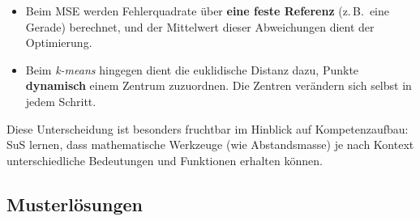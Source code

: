 \begin{itemize}
  \item Beim MSE werden Fehlerquadrate über \textbf{eine feste Referenz} (z.\,B.\ eine Gerade) berechnet, und der Mittelwert dieser Abweichungen dient der Optimierung.
  \item Beim \textit{k-means} hingegen dient die euklidische Distanz dazu, Punkte \textbf{dynamisch} einem Zentrum zuzuordnen. Die Zentren verändern sich selbst in jedem Schritt.
\end{itemize}

Diese Unterscheidung ist besonders fruchtbar im Hinblick auf Kompetenzaufbau: SuS lernen, dass mathematische Werkzeuge (wie Abstandsmasse) je nach Kontext unterschiedliche Bedeutungen und Funktionen erhalten können.


\subsection*{Musterlösungen}

